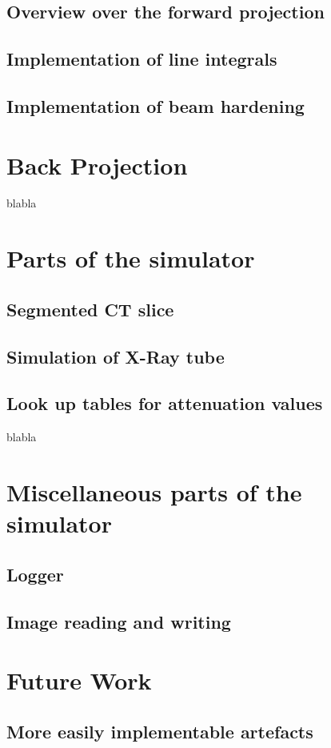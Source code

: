 \subsection{Overview over the forward projection}
\subsection{Implementation of line integrals}
\subsection{Implementation of beam hardening}
\section{Back Projection}
blabla\cite{CUDABackprojection}
\section{Parts of the simulator}
\subsection{Segmented CT slice}
\subsection{Simulation of X-Ray tube}
\subsection{Look up tables for attenuation values}
blabla\cite{AttenuationTable}
\section{Miscellaneous parts of the simulator}
\subsection{Logger}
\subsection{Image reading and writing}
\section{Future Work}
\subsection{More easily implementable artefacts}
